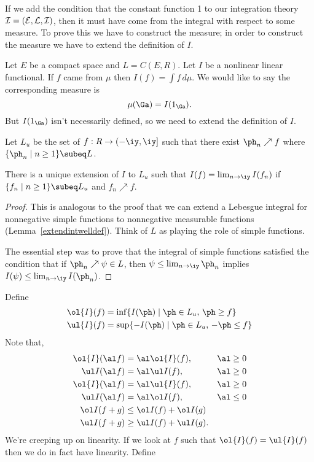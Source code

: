 
If we add the condition that the constant function 1 to our integration theory $\cal I=(E,L,I)$, then it must have come from the integral with respect to some measure. To prove this we have to construct the measure; in order to construct the measure we have to extend the definition of $I$.

Let $E$ be a compact space and $L=C(E,R)$.  Let $I$ be a nonlinear linear functional. If $f$ came from $\mu$ then $I(f)=\int f\,d\mu$. We would like to say the corresponding measure is
\[
\mu(\Ga)=I(1_{\Ga}).
\]
But $I(1_{\Ga})$ isn't necessarily defined, so we need to extend the definition of $I$.

Let $L_u$ be the set of $f:R\to (-\iy,\iy]$ such that there exist $\ph_n\nearrow f$ where $\{\ph_n\mid n\ge 1\}\subeq L$.
\begin{clm}
There is a unique extension of $I$ to $L_u$ such that $I(f)=\lim_{n\to \iy} I(f_n)$ if $\{f_n\mid n\ge 1\}\subeq L_u$ and $f_n\nearrow f$.
\end{clm}
\begin{proof}
This is analogous to the proof that we can extend a Lebesgue integral for nonnegative simple functions to nonnegative measurable functions (Lemma~\ref{extendintwelldef}). Think of $L$ as playing the role of simple functions.

The essential step was to prove that the integral of simple functions satisfied the condition that if $\ph_n\nearrow \psi\in L$, then $\psi\le \lim_{n\to \iy}\ph_n$ implies $I(\psi)\le \lim_{n\to \iy} I(\ph_n)$. 
\end{proof}
Define 
\begin{align*}
\ol{I}(f)&=\inf\{I(\ph)\mid \ph\in L_u,\,\ph\ge f\}\\
\ul{I}(f)&=\sup\{-I(\ph)\mid \ph\in L_u,\,-\ph\le f\}
\end{align*}
Note that, 
\begin{align*}
\ol{I}(\al f)&=\al\ol{I}(f),&\al\ge 0\\
\ul I(\al f)&=\al\ul I(f), &\al \ge 0\\
\ol{I}(\al f)&=\al\ul{I}(f),&\al\ge 0\\
\ul I(\al f)&=\al\ol I(f), &\al \le 0\\
\ol I(f+g)&\le \ol I(f)+\ol I(g)\\
\ul I(f+g)&\ge \ul I(f)+\ul I(g).
\end{align*}
We're creeping up on linearity. If we look at $f$ such that $\ol{I}(f)=\ul{I}(f)$ then we do in fact have linearity. Define
